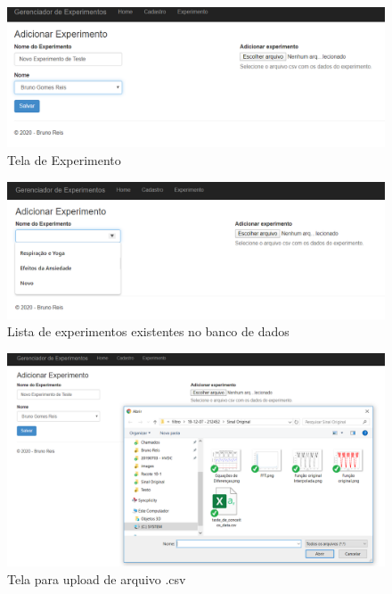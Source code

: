   \begin{figure}[h!]
	\begin{center}
		\includegraphics[width=0.8\linewidth]{images/experimento.png}
		\caption{Tela de Experimento}
		\label{fig:experimento}
	\end{center}
\end{figure}

  \begin{figure}[h!]
	\begin{center}
		\includegraphics[width=0.8\linewidth]{images/experimento_lista.png}
		\caption{Lista de experimentos existentes no banco de dados}
		\label{fig:experimento_lista}
	\end{center}
\end{figure}

  \begin{figure}[h!]
	\begin{center}
		\includegraphics[width=0.8\linewidth]{images/experimento_csv.png}
		\caption{Tela para upload de arquivo .csv}
		\label{fig:experimento_csv}
	\end{center}
\end{figure}


